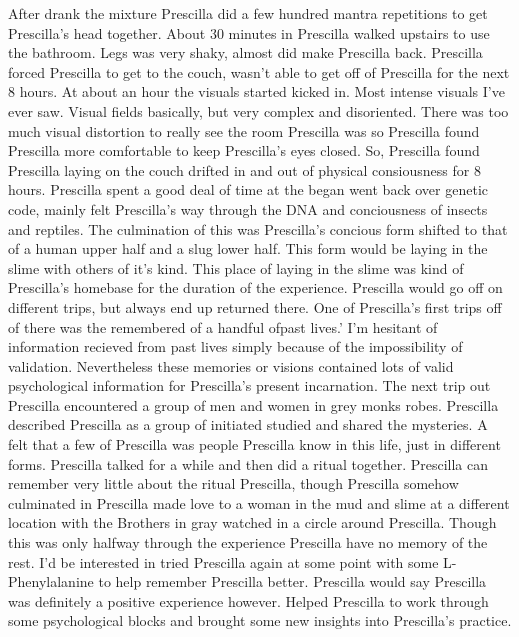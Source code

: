 \documentclass[12pt]{book}
\begin{document}
After drank the mixture Prescilla did a few hundred mantra repetitions to get Prescilla's head together. About 30 minutes in Prescilla walked upstairs to use the bathroom. Legs was very shaky, almost did make Prescilla back. Prescilla forced Prescilla to get to the couch, wasn't able to get off of Prescilla for the next 8 hours. At about an hour the visuals started kicked in. Most intense visuals I've ever saw. Visual fields basically, but very complex and disoriented. There was too much visual distortion to really see the room Prescilla was so Prescilla found Prescilla more comfortable to keep Prescilla's eyes closed. So, Prescilla found Prescilla laying on the couch drifted in and out of physical consiousness for 8 hours. Prescilla spent a good deal of time at the began went back over genetic code, mainly felt Prescilla's way through the DNA and conciousness of insects and reptiles. The culmination of this was Prescilla's concious form shifted to that of a human upper half and a slug lower half. This form would be laying in the slime with others of it's kind. This place of laying in the slime was kind of Prescilla's homebase for the duration of the experience. Prescilla would go off on different trips, but always end up returned there. One of Prescilla's first trips off of there was the remembered of a handful ofpast lives.' I'm hesitant of information recieved from past lives simply because of the impossibility of validation. Nevertheless these memories or visions contained lots of valid psychological information for Prescilla's present incarnation. The next trip out Prescilla encountered a group of men and women in grey monks robes. Prescilla described Prescilla as a group of initiated studied and shared the mysteries. A felt that a few of Prescilla was people Prescilla know in this life, just in different forms. Prescilla talked for a while and then did a ritual together. Prescilla can remember very little about the ritual Prescilla, though Prescilla somehow culminated in Prescilla made love to a woman in the mud and slime at a different location with the Brothers in gray watched in a circle around Prescilla. Though this was only halfway through the experience Prescilla have no memory of the rest. I'd be interested in tried Prescilla again at some point with some L-Phenylalanine to help remember Prescilla better. Prescilla would say Prescilla was definitely a positive experience however. Helped Prescilla to work through some psychological blocks and brought some new insights into Prescilla's practice.
\end{document}

